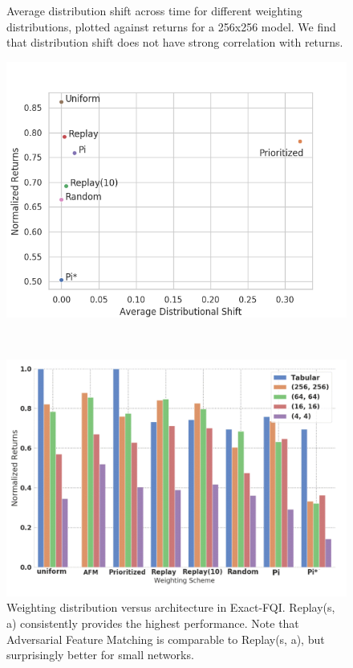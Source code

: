 \begin{figure}[ttt!]
\begin{minipage}[t]{0.32\linewidth}
\caption{\label{fig:distribution_shift_vs_returns} Average distribution shift across time for different weighting distributions, plotted against returns for a 256x256 model. We find that distribution shift does not have strong correlation with returns.}
\includegraphics[width=0.99\columnwidth]{chapters/diagnosing_q/images/returns_vs_shift}
\vspace{-0.2in}
\end{minipage}
~\vline~
\begin{minipage}[t]{0.32\linewidth}
\caption{\label{fig:weighting_schemes} Weighting distribution versus architecture in Exact-FQI. Replay(s, a) consistently provides the highest performance. Note that Adversarial Feature Matching is comparable to Replay(s, a), but surprisingly better for small networks. }
\includegraphics[width=0.99\columnwidth]{chapters/diagnosing_q/images/exact_fqi_schemes.pdf}

\end{minipage}
\end{figure}
